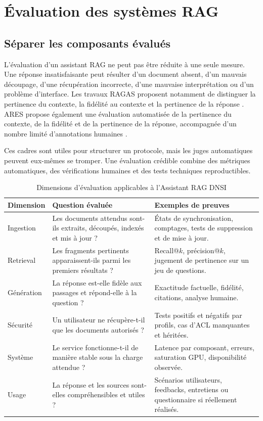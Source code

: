 \section{Évaluation des systèmes RAG}

\subsection{Séparer les composants évalués}

L'évaluation d'un assistant RAG ne peut pas être réduite à une seule mesure. Une réponse insatisfaisante peut résulter d'un document absent, d'un mauvais découpage, d'une récupération incorrecte, d'une mauvaise interprétation ou d'un problème d'interface. Les travaux RAGAS proposent notamment de distinguer la pertinence du contexte, la fidélité au contexte et la pertinence de la réponse \citep{Es2024RAGAS}. ARES propose également une évaluation automatisée de la pertinence du contexte, de la fidélité et de la pertinence de la réponse, accompagnée d'un nombre limité d'annotations humaines \citep{SaadFalcon2024ARES}.

Ces cadres sont utiles pour structurer un protocole, mais les juges automatiques peuvent eux-mêmes se tromper. Une évaluation crédible combine des métriques automatiques, des vérifications humaines et des tests techniques reproductibles.

\begin{table}[H]
\centering
\caption{Dimensions d'évaluation applicables à l'Assistant RAG DNSI}
\label{tab:evaluation_dimensions}
\begin{tabular}{p{3.2cm}p{6cm}p{4.5cm}}
\toprule
\textbf{Dimension} & \textbf{Question évaluée} & \textbf{Exemples de preuves} \\
\midrule
Ingestion & Les documents attendus sont-ils extraits, découpés, indexés et mis à jour ? & États de synchronisation, comptages, tests de suppression et de mise à jour. \\
Retrieval & Les fragments pertinents apparaissent-ils parmi les premiers résultats ? & Recall@$k$, précision@$k$, jugement de pertinence sur un jeu de questions. \\
Génération & La réponse est-elle fidèle aux passages et répond-elle à la question ? & Exactitude factuelle, fidélité, citations, analyse humaine. \\
Sécurité & Un utilisateur ne récupère-t-il que les documents autorisés ? & Tests positifs et négatifs par profils, cas d'ACL manquantes et héritées. \\
Système & Le service fonctionne-t-il de manière stable sous la charge attendue ? & Latence par composant, erreurs, saturation GPU, disponibilité observée. \\
Usage & La réponse et les sources sont-elles compréhensibles et utiles ? & Scénarios utilisateurs, feedbacks, entretiens ou questionnaire si réellement réalisés. \\
\bottomrule
\end{tabular}
\end{table}

